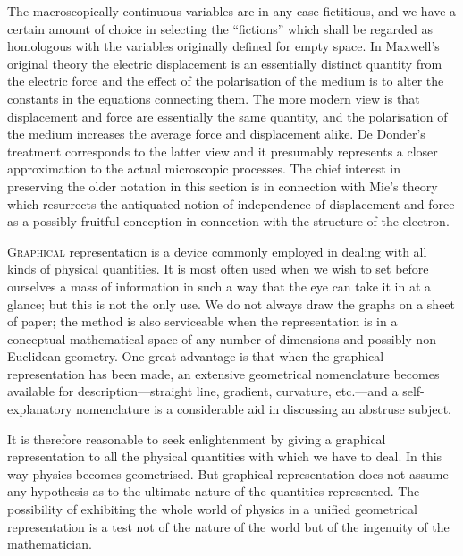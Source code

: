 \documentclass[12pt]{book}
\begin{document}
The macroscopically continuous variables are in any case fictitious, and we have a certain amount of choice in
selecting the ``fictions'' which shall be regarded as homologous with the variables originally defined for
empty space.
In Maxwell's original theory the electric displacement is an essentially distinct quantity from the electric force
and the effect of the polarisation of the medium is to alter the constants in the equations connecting them.
The more modern view is that displacement and force are essentially the same quantity, and the polarisation of
the medium increases the average force and displacement alike.
De Donder's treatment corresponds to the latter view and it presumably represents a closer approximation to
the actual microscopic processes.
The chief interest in preserving the older notation in this section is in connection with Mie's theory which
resurrects the antiquated notion of independence of displacement and force as a possibly fruitful conception in
connection with the structure of the electron.



%

\lettrine{G}{raphical} representation is a device commonly employed in dealing with
%
all kinds of physical quantities. It is most often used when we wish to set
before ourselves a mass of information in such a way that the eye can take it
in at a glance; but this is not the only use. We do not always draw the graphs
on a sheet of paper; the method is also serviceable when the representation
is in a conceptual mathematical space of any number of dimensions and possibly
non-Euclidean geometry. One great advantage is that when the graphical
representation has been made, an extensive geometrical nomenclature becomes
available for description---straight line, gradient, curvature, etc.---and a self-explanatory
nomenclature is a considerable aid in discussing an abstruse
subject.

It is therefore reasonable to seek enlightenment by giving a graphical
representation to all the physical quantities with which we have to deal. In
this way physics becomes geometrised. But graphical representation does not
assume any hypothesis as to the ultimate nature of the quantities represented.
The possibility of exhibiting the whole world of physics in a unified geometrical
representation is a test not of the nature of the world but of the ingenuity of
the mathematician.
\end{document}
